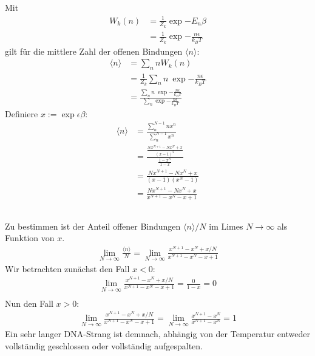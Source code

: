 \subsection{}
Mit
\begin{align*}
W_k(n) &= \frac{1}{Z_k} \exp{-E_n \beta} \\
&= \frac{1}{Z_k} \exp{-\frac{n \epsilon}{k_B T}}
\end{align*} 
gilt für die mittlere Zahl der offenen Bindungen  $\langle n \rangle $:
\begin{align*}
\langle n \rangle &= \sum_n n W_k(n) \\
&= \frac{1}{Z_k} \sum_n n \ \exp{-\frac{n \epsilon}{k_B T}} \\
&= \frac{\sum_n n \ \exp{-\frac{n \epsilon}{k_B T}}}{\sum_n \exp{-\frac{n\epsilon}{k_B T}}}
\end{align*}
Definiere $x := \exp{\epsilon \beta}$:
\begin{align*}
\langle n \rangle &= \frac{\sum_n^{N-1} n x^n}{\sum_n^{N-1} x^n} \\
&=\frac{\frac{Nx^{N+1}-Nx^{N}+x}{(x-1)^2}}{\frac{1-x^{N}}{1-x}} \\
&=\frac{Nx^{N+1}-Nx^{N}+x}{(x-1)(x^{N}-1)} \\
&=\frac{Nx^{N+1}-Nx^{N}+x}{x^{N+1}-x^{N}-x+1}
\end{align*}

\subsection{}
Zu bestimmen ist der Anteil offener Bindungen $\langle n \rangle/ N$ im Limes $N \rightarrow \infty$ als Funktion von $x$.
\begin{align*}
\lim_{N \rightarrow \infty} \frac{\langle n \rangle}{N}=\lim_{N \rightarrow \infty} \frac{x^{N+1}-x^{N}+x/N}{x^{N+1}-x^{N}-x+1}
\end{align*}
Wir betrachten zunächst den Fall $x<0$:
\begin{align*}
\lim_{N \rightarrow \infty} \frac{x^{N+1}-x^{N}+x/N}{x^{N+1}-x^{N}-x+1}=\frac{0}{1-x}=0 \\
\end{align*}
Nun den Fall $x>0$:
\begin{align*}
\lim_{N \rightarrow \infty} \frac{x^{N+1}-x^{N}+x/N}{x^{N+1}-x^{N}-x+1}= \lim_{N \rightarrow \infty} \frac{x^{N+1}-x^{N}}{x^{N+1}-x^{N}}=1
\end{align*}
Ein sehr langer DNA-Strang ist demnach, abhängig von der Temperatur entweder vollständig geschlossen oder vollständig aufgespalten.

